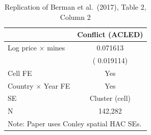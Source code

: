 \begin{table}[htbp]
\centering
\caption{Replication of Berman et al.\ (2017), Table 2, Column 2}
\label{tab:berman_t2c2}
\begin{tabular}{lc}
\hline\hline
 & Conflict (ACLED) \\
\hline
Log price $\times$ mines &     0.071613 \\
 & (    0.019114) \\
\hline
Cell FE & Yes \\
Country $\times$ Year FE & Yes \\
SE & Cluster (cell) \\
N &   142,282 \\
\hline\hline
\multicolumn{2}{l}{\footnotesize Note: Paper uses Conley spatial HAC SEs.} \\
\end{tabular}
\end{table}
